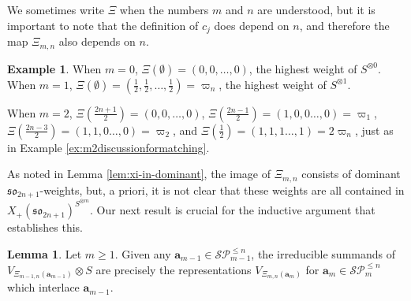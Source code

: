 \documentclass[10pt]{amsart}
\numberwithin{equation}{section}
\theoremstyle{definition}
\newtheorem{lem}[thm]{Lemma}
\newtheorem{example}[thm]{Example}
\newcommand{\son}[1][2n+1]{\mathfrak{so}_{#1}}
\newcommand{\ab}{\mathbf{a}}
\newcommand{\SP}{\mathcal{SP}}
\begin{document}
We sometimes write $\Xi$ when the numbers $m$ and $n$ are understood, 
but it is important to note that the definition of $c_j$ does depend on $n$, 
and therefore the map $\Xi_{m,n}$ also depends on $n$.

\begin{example}\label{ex:basecase}
When $m=0$, 
$\Xi(\emptyset) = (0,0,\ldots, 0)$, the highest weight of $S^{\otimes 0}$. 
When $m=1$, $\Xi(\emptyset) = (\frac{1}{2}, \frac{1}{2}, \ldots, \frac{1}{2})
= \varpi_n$, the highest weight of $S^{\otimes 1}$. 

When $m=2$, $\Xi(\frac{2n+1}{2}) = (0,0,\ldots,0)$, $\Xi(\frac{2n-1}{2}) = (1,0,0\ldots,0)= \varpi_1$, 
$\Xi(\frac{2n-3}{2}) = (1,1,0\ldots,0)= \varpi_2$, and $\Xi(\frac{1}{2}) = (1,1,1\ldots,1)= 2 \varpi_n$, 
just as in Example \ref{ex:m2discussionformatching}. 
\end{example}

As noted in Lemma \ref{lem:xi-in-dominant}, the image of $\Xi_{m,n}$ consists of dominant $\son$-weights, 
but, a priori, it is not clear that these weights are all contained in $X_+(\son)^{S^{\otimes m}}$.
Our next result is crucial for the inductive argument that establishes this.

\begin{lem}\label{lem:bijection}
Let $m \geq 1$.
Given any $\ab_{m-1}\in \SP_{m-1}^{\le n}$, 
the irreducible summands of $V_{\Xi_{m-1,n}(\ab_{m-1})} \otimes S$ 
are precisely the representations $V_{\Xi_{m,n}(\ab_m)}$ for 
$\ab_m\in \SP_m^{\le n}$ which interlace $\ab_{m-1}$. 
\end{lem}
\end{document}
